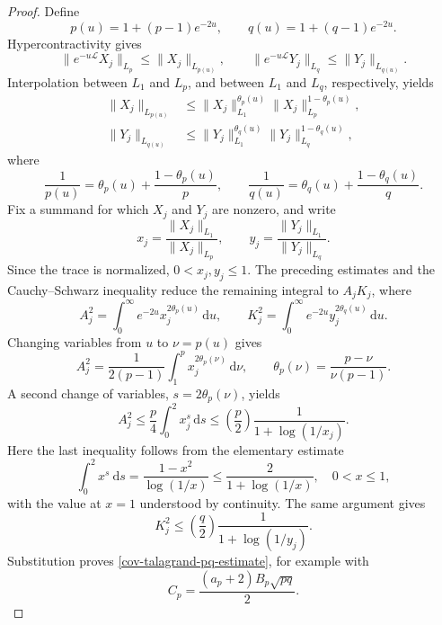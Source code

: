 \documentclass{amsbook}
\theoremstyle{definition}
\theoremstyle{remark}
\numberwithin{section}{chapter}
\numberwithin{equation}{chapter}
\newcommand{\1}{\mathbf{1}}
\begin{document}
\begin{proof}
Define
\[
p(u)=1+(p-1)e^{-2u},
\qquad
q(u)=1+(q-1)e^{-2u}.
\]
Hypercontractivity gives
\[
\|e^{-u\mathcal{L}}X_{j}\|_{L_{p}}
 \leq \|X_{j}\|_{L_{p(u)}},
\qquad
\|e^{-u\mathcal{L}}Y_{j}\|_{L_{q}}
 \leq \|Y_{j}\|_{L_{q(u)}}.
\]
Interpolation between $L_{1}$ and $L_{p}$, and between $L_{1}$ and $L_{q}$,
respectively, yields
\begin{align*}
\|X_{j}\|_{L_{p(u)}}
&\leq \|X_{j}\|_{L_{1}}^{\theta_{p}(u)}
       \|X_{j}\|_{L_{p}}^{1-\theta_{p}(u)},\\
\|Y_{j}\|_{L_{q(u)}}
&\leq \|Y_{j}\|_{L_{1}}^{\theta_{q}(u)}
       \|Y_{j}\|_{L_{q}}^{1-\theta_{q}(u)},
\end{align*}
where
\[
\frac{1}{p(u)}=\theta_{p}(u)+\frac{1-\theta_{p}(u)}{p},
\qquad
\frac{1}{q(u)}=\theta_{q}(u)+\frac{1-\theta_{q}(u)}{q}.
\]
Fix a summand for which $X_{j}$ and $Y_{j}$ are nonzero, and write
\[
x_{j}=\frac{\|X_{j}\|_{L_{1}}}{\|X_{j}\|_{L_{p}}},
\qquad
y_{j}=\frac{\|Y_{j}\|_{L_{1}}}{\|Y_{j}\|_{L_{q}}}.
\]
Since the trace is normalized, $0<x_{j},y_{j}\leq1$.  The preceding estimates
and the Cauchy--Schwarz inequality reduce the remaining integral to
$A_{j}K_{j}$, where
\[
A_{j}^{2}=\int_{0}^{\infty}e^{-2u}x_{j}^{2\theta_{p}(u)}\,\mathrm{d}u,
\qquad
K_{j}^{2}=\int_{0}^{\infty}e^{-2u}y_{j}^{2\theta_{q}(u)}\,\mathrm{d}u.
\]
Changing variables from $u$ to $\nu=p(u)$ gives
\[
A_{j}^{2}
 =\frac{1}{2(p-1)}\int_{1}^{p}x_{j}^{2\theta_{p}(\nu)}\,\mathrm{d}\nu,
\qquad
\theta_{p}(\nu)=\frac{p-\nu}{\nu(p-1)}.
\]
A second change of variables, $s=2\theta_{p}(\nu)$, yields
\[
A_{j}^{2}\leq\frac{p}{4}\int_{0}^{2}x_{j}^{s}\,\mathrm{d}s \leq\left(\frac{p}{2}\right)\frac{1}{1+\log(1/x_{j})}.
\]
Here the last inequality follows from the elementary estimate
\[
\int_{0}^{2}x^{s}~\mathrm{d}s=\frac{1-x^{2}}{\log(1/x)}\leq\frac{2}{1+\log(1/x)}, \quad 0<x\leq1,
\]
with the value at $x=1$ understood by continuity.  The same argument gives
\[
K_{j}^{2}\leq\left(\frac{q}{2}\right)\frac{1}{1+\log(1/y_{j})}.
\]
Substitution proves \eqref{cov-talagrand-pq-estimate}, for example with
\[
C_{p}=\frac{(a_{p}+2)B_{p}\sqrt{pq}}{2}.
\]

\end{proof}
\end{document}
